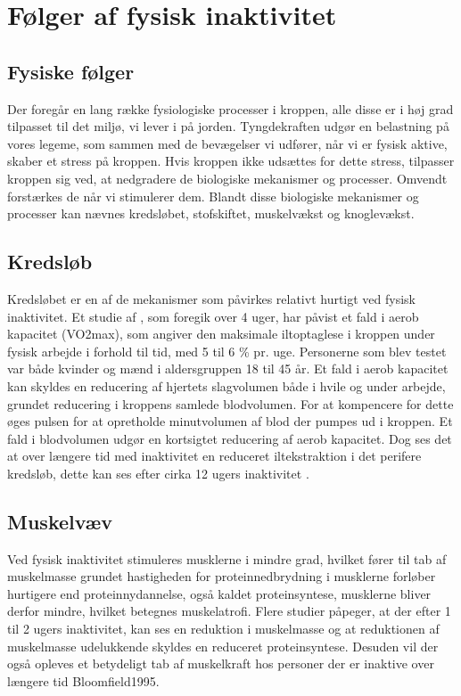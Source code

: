 \section{Følger af fysisk inaktivitet}

\subsection{Fysiske følger}

Der foregår en lang række fysiologiske processer i kroppen, alle disse er i høj grad tilpasset til det miljø, vi lever i på jorden. Tyngdekraften udgør en belastning på vores legeme, som sammen med de bevægelser vi udfører, når vi er fysisk aktive, skaber et stress på kroppen. Hvis kroppen ikke udsættes for dette stress, tilpasser kroppen sig ved, at nedgradere de biologiske mekanismer og processer. Omvendt forstærkes de når vi stimulerer dem. Blandt disse biologiske mekanismer og processer kan nævnes kredsløbet, stofskiftet, muskelvækst og knoglevækst.\citep{motionsraad2007}

\subsection{Kredsløb}
Kredsløbet er en af de mekanismer som påvirkes relativt hurtigt ved fysisk inaktivitet. Et studie af \citep{Convertino1995}, som foregik over 4 uger, har påvist et fald i aerob kapacitet (VO2max), som angiver den maksimale iltoptaglese i kroppen under fysisk arbejde i forhold til tid, med 5 til 6 \% pr. uge. Personerne som blev testet var både kvinder og mænd i aldersgruppen 18 til 45 år. Et fald i aerob kapacitet kan skyldes en reducering af hjertets slagvolumen både i hvile og under arbejde, grundet reducering i kroppens samlede blodvolumen. For at kompencere for dette øges pulsen for at opretholde minutvolumen af blod der pumpes ud i kroppen. Et fald i blodvolumen udgør en kortsigtet reducering af aerob kapacitet.\citep{Convertino1995} Dog ses det at over længere tid med inaktivitet en reduceret iltekstraktion i det perifere kredsløb, dette kan ses efter cirka 12 ugers inaktivitet \citep{Coyle1985}.

\subsection{Muskelvæv}
Ved fysisk inaktivitet stimuleres musklerne i mindre grad, hvilket fører til tab af muskelmasse grundet hastigheden for proteinnedbrydning i musklerne forløber hurtigere end proteinnydannelse, også kaldet proteinsyntese, musklerne bliver derfor mindre, hvilket betegnes muskelatrofi. Flere studier påpeger, at der efter 1 til 2 ugers inaktivitet, kan ses en reduktion i muskelmasse og at reduktionen af muskelmasse udelukkende skyldes en reduceret proteinsyntese\citep{Douglas2006}. \citep{Bloomsfield1995} Desuden vil der også opleves et betydeligt tab af muskelkraft hos personer der er inaktive over længere tid {Bloomfield1995}. 

